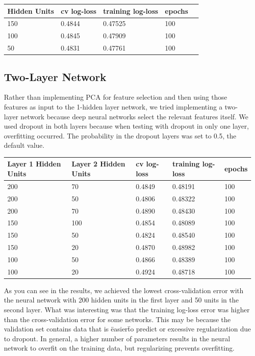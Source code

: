 \documentclass[twoside,11pt]{article}
\theoremstyle{definition}
\begin{document}
      \begin{center}
          \begin{tabular}{ | l | l | l | l | p{5cm} |}
          \hline
          Hidden Units & cv log-loss & training log-loss & epochs \\ \hline
          150 & 0.4844 & 0.47525 & 100 \\ \hline
          100 & 0.4845 & 0.47909 & 100 \\ \hline
          50 & 0.4831 & 0.47761 & 100 \\ \hline 
          \end{tabular}
      \end{center}

\subsection{Two-Layer Network}
Rather than implementing PCA for feature selection and then using those features as input to the 1-hidden layer network, we tried implementing a two-layer network because deep neural networks select the relevant features itself. We used dropout in both layers because when testing with dropout in only one layer, overfitting occurred. The probability in the dropout layers was set to 0.5, the default value. 

      \begin{center}
          \begin{tabular}{ | l | l | l | l | p{5cm} |}
          \hline
          Layer 1 Hidden Units & Layer 2 Hidden Units & cv log-loss & training log-loss & epochs \\ \hline
          200 & 70 & 0.4849 & 0.48191 & 100 \\ \hline
          200 & 50 & 0.4806 & 0.48322 & 100 \\ \hline
          200 & 70 & 0.4890 & 0.48430 & 100 \\ \hline
          150 & 100 & 0.4854 & 0.48089 & 100 \\ \hline
          150 & 50 & 0.4824 & 0.48540 & 100 \\ \hline
          150 & 20 & 0.4870 & 0.48982 & 100 \\ \hline
          100 & 50 & 0.4866 & 0.48389 & 100 \\ \hline
          100 & 20 & 0.4924 & 0.48718 & 100 \\ \hline
          \end{tabular}
      \end{center}

As you can see in the results, we achieved the lowest cross-validation error with the neural network with 200 hidden units in the first layer and 50 units in the second layer. What was interesting was that the training log-loss error was higher than the cross-validation error for some networks. This may be because the validation set contains data that is \"easier\" to predict or excessive regularization due to dropout. In general, a higher number of parameters results in the neural network to overfit on the training data, but regularizing prevents overfitting. 
\end{document}

